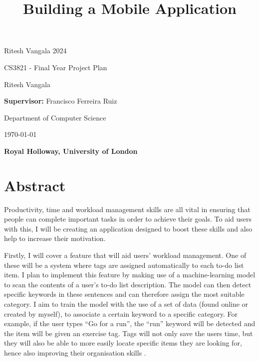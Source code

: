 \documentclass[12pt]{article}
\begin{document}
\begin{titlepage}
    \center
    Ritesh Vangala 2024
    \vspace*{1cm}
    
    \title{Building a Mobile Application}
    {\Huge \bfseries \thetitle\par}
    \vspace{0.5cm}

    CS3821 - Final Year Project Plan
    {\Large \textit{\thesubtitle}\par}
    \vspace{0.5cm}
    \vspace{0.5cm}
    Ritesh Vangala
    {\Large \theauthor\par}
    \vspace{0.5cm}
    \textbf{Supervisor:} Francisco Ferreira Ruiz
    
    \vspace{0.5cm}
    Department of Computer Science
    \vspace{0.5cm}

    \today
    {\large \thedate\par}
    
    \vspace{2cm}
    
    {\large \textbf{Royal Holloway, University of London}}
    
\end{titlepage}

\section{Abstract}
Productivity, time and workload management skills are all vital in ensuring that people can complete important tasks in order to achieve their goals. To aid users with this, I will be creating an application designed to boost these skills and also help to  increase their motivation.

Firstly, I will cover a feature that will aid users’ workload management. One of these will be a system where tags are assigned automatically to each to-do list item. I plan to implement this feature by making use of a machine-learning model to scan the contents of a user’s to-do list description. The model can then detect specific keywords in these sentences and can therefore assign the most suitable category.  I aim to train the model with the use of a set of data (found online or created by myself), to associate a certain keyword to a specific category. For example, if the user types “Go for a run”, the “run” keyword will be detected and the item will be given an exercise tag. Tags will not only save the users time, but they will also be able to more easily locate specific items they are looking for, hence also improving their organisation skills \cite{one}.  
\end{document}
